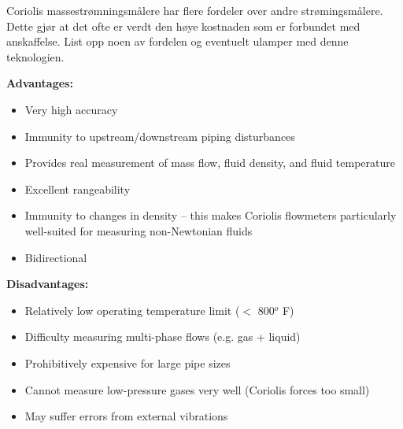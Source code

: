 

Coriolis massestrømningsmålere har flere fordeler over andre strømingsmålere. Dette gjør at det ofte er verdt den høye kostnaden som er forbundet med anskaffelse. List opp noen av fordelen og eventuelt ulamper med denne teknologien.  







{\bf Advantages:}

\begin{itemize}
\item{} Very high accuracy
\item{} Immunity to upstream/downstream piping disturbances
\item{} Provides real measurement of mass flow, fluid density, and fluid temperature
\item{} Excellent rangeability
\item{} Immunity to changes in density -- this makes Coriolis flowmeters particularly well-suited for measuring non-Newtonian fluids
\item{} Bidirectional
\end{itemize}

\vskip 10pt

{\bf Disadvantages:}

\begin{itemize}
\item{} Relatively low operating temperature limit ($<$ 800$^{o}$ F)
\item{} Difficulty measuring multi-phase flows (e.g. gas + liquid)
\item{} Prohibitively expensive for large pipe sizes
\item{} Cannot measure low-pressure gases very well (Coriolis forces too small)
\item{} May suffer errors from external vibrations
\end{itemize}

